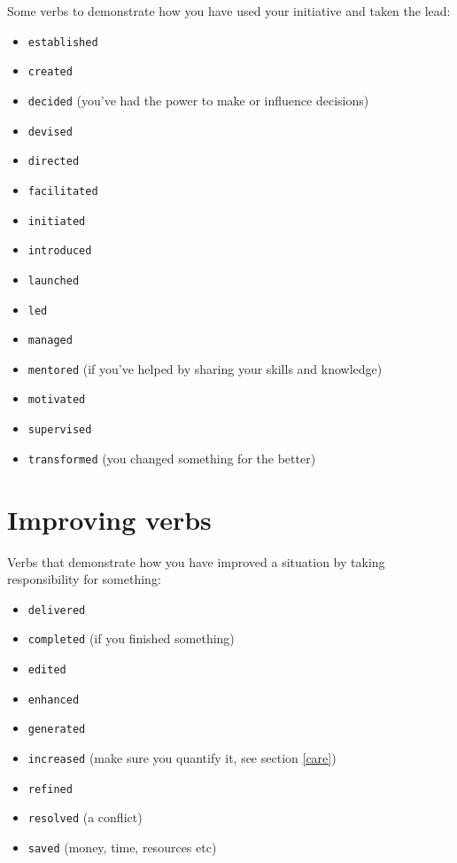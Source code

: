 \documentclass[
]{book}
\providecommand{\tightlist}{%
  \setlength{\itemsep}{0pt}\setlength{\parskip}{0pt}}
\begin{document}
Some verbs to demonstrate how you have used your initiative and taken the lead:

\begin{itemize}
\tightlist
\item
  \texttt{established}
\item
  \texttt{created}
\item
  \texttt{decided} (you've had the power to make or influence decisions)
\item
  \texttt{devised}
\item
  \texttt{directed}
\item
  \texttt{facilitated}
\item
  \texttt{initiated}
\item
  \texttt{introduced}
\item
  \texttt{launched}
\item
  \texttt{led}
\item
  \texttt{managed}
\item
  \texttt{mentored} (if you've helped by sharing your skills and knowledge)
\item
  \texttt{motivated}
\item
  \texttt{supervised}
\item
  \texttt{transformed} (you changed something for the better)
\end{itemize}

\hypertarget{improving}{%
\section{Improving verbs}\label{improving}}

Verbs that demonstrate how you have improved a situation by taking responsibility for something:

\begin{itemize}
\tightlist
\item
  \texttt{delivered}
\item
  \texttt{completed} (if you finished something)
\item
  \texttt{edited}
\item
  \texttt{enhanced}
\item
  \texttt{generated}
\item
  \texttt{increased} (make sure you quantify it, see section \ref{care})
\item
  \texttt{refined}
\item
  \texttt{resolved} (a conflict)
\item
  \texttt{saved} (money, time, resources etc)
\end{itemize}
\end{document}
